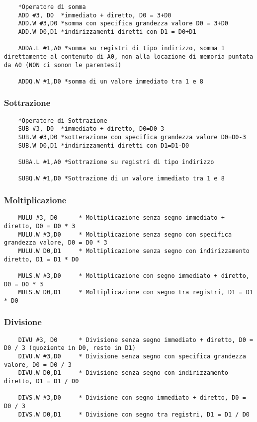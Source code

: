 \begin{lstlisting}
    *Operatore di somma
    ADD #3, D0  *immediato + diretto, D0 = 3+D0
    ADD.W #3,D0 *somma con specifica grandezza valore D0 = 3+D0
    ADD.W D0,D1 *indirizzamenti diretti con D1 = D0+D1

    ADDA.L #1,A0 *somma su registri di tipo indirizzo, somma 1 direttamente al contenuto di A0, non alla locazione di memoria puntata da A0 (NON ci sonon le parentesi)

    ADDQ.W #1,D0 *somma di un valore immediato tra 1 e 8
\end{lstlisting}

\subsubsection{Sottrazione}

\begin{lstlisting}
    *Operatore di Sottrazione
    SUB #3, D0  *immediato + diretto, D0=D0-3
    SUB.W #3,D0 *sotterazione con specifica grandezza valore D0=D0-3
    SUB.W D0,D1 *indirizzamenti diretti con D1=D1-D0

    SUBA.L #1,A0 *Sottrazione su registri di tipo indirizzo

    SUBQ.W #1,D0 *Sottrazione di un valore immediato tra 1 e 8
\end{lstlisting}

\subsubsection{Moltiplicazione}

\begin{lstlisting}
    MULU #3, D0      * Moltiplicazione senza segno immediato + diretto, D0 = D0 * 3
    MULU.W #3,D0     * Moltiplicazione senza segno con specifica grandezza valore, D0 = D0 * 3
    MULU.W D0,D1     * Moltiplicazione senza segno con indirizzamento diretto, D1 = D1 * D0

    MULS.W #3,D0     * Moltiplicazione con segno immediato + diretto, D0 = D0 * 3
    MULS.W D0,D1     * Moltiplicazione con segno tra registri, D1 = D1 * D0
\end{lstlisting}

\subsubsection{Divisione}

\begin{lstlisting}
    DIVU #3, D0      * Divisione senza segno immediato + diretto, D0 = D0 / 3 (quoziente in D0, resto in D1)
    DIVU.W #3,D0     * Divisione senza segno con specifica grandezza valore, D0 = D0 / 3
    DIVU.W D0,D1     * Divisione senza segno con indirizzamento diretto, D1 = D1 / D0

    DIVS.W #3,D0     * Divisione con segno immediato + diretto, D0 = D0 / 3
    DIVS.W D0,D1     * Divisione con segno tra registri, D1 = D1 / D0
\end{lstlisting}

